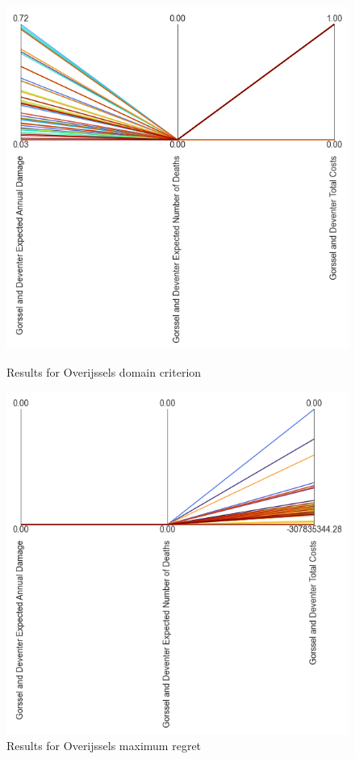 \begin{figure}[H]
  \centering
  \begin{minipage}[b]{0.4\textwidth}
    \includegraphics[width=1.15\textwidth]{report/figures/results/domain_criterion_Overijssel.png}
    \caption{Results for Overijssels domain criterion}
    \label{fig:domain_criterion_Overijssels}
  \end{minipage}
  \hfill
  \begin{minipage}[b]{0.4\textwidth}
    \includegraphics[width=1.15\textwidth]{report/figures/results/regret_figure_Overijssel.png}
    \caption{Results for Overijssels maximum regret}
    \label{fig:regret_Overijssels}
  \end{minipage}
\end{figure}

